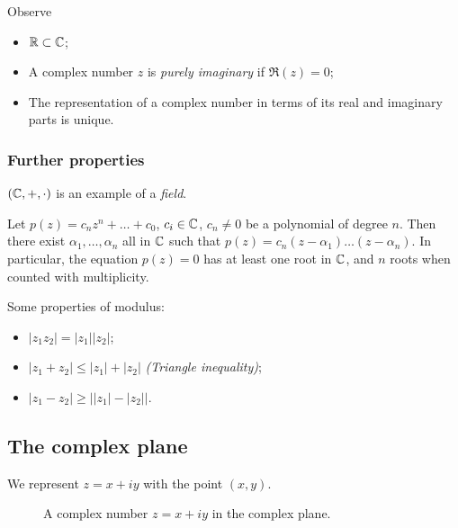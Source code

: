 \documentclass{../template/note}
\begin{document}
    \begin{remark*}
        Observe
        \begin{itemize}
            \item \(\mathbb R \subset \mathbb C\);
            \item A complex number \(z\) is \emph{purely imaginary} if \(\Re(z) = 0\);
            \item The representation of a complex number in terms of its real and imaginary parts is unique.
        \end{itemize}
    \end{remark*}
    
    \subsubsection{Further properties}

    \((\mathbb C, +, \cdot)\) is an example of a \emph{field}.

    \begin{theorem}
        Let \(p(z) = c_nz^n + \dots + c_0\), \(c_i \in \mathbb C\), \(c_n \neq 0\) be a polynomial of degree \(n\). Then there exist \(\alpha_1, \dots, \alpha_n\) all in \(\mathbb C\) such that \(p(z) = c_n(z-\alpha_1)\dots(z-\alpha_n)\). In particular, the equation \(p(z)=0\) has at least one root in \(\mathbb C\), and \(n\) roots when counted with multiplicity.
        \label{fta}
    \end{theorem}

    \noindent Some properties of modulus:

    \begin{itemize}
        \item \(|z_1z_2| = |z_1||z_2|\);
        \item \(|z_1 + z_2| \leq |z_1| + |z_2|\) \emph{(Triangle inequality)};
        \item \(|z_1 - z_2| \geq \left||z_1|-|z_2|\right|\).
    \end{itemize}

    \subsection{The complex plane}

    We represent \(z = x+iy\) with the point \((x, y)\).

    \begin{figure}[ht]
        \centering
        \caption{A complex number \(z = x+iy\) in the complex plane.}
        \label{fig:argand-basic}
    \end{figure}
    
\end{document}
